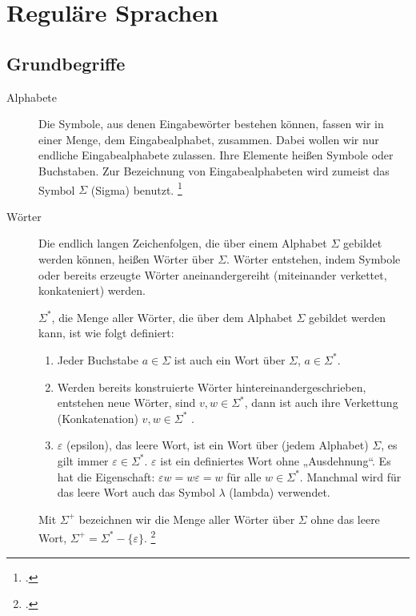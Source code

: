\documentclass{bschlangaul-theorie}
\begin{document}

\chapter{Reguläre Sprachen}

%

\section{Grundbegriffe}

\begin{description}
\item[Alphabete]

Die Symbole, aus denen Eingabewörter bestehen können, fassen wir in
einer Menge, dem Eingabealphabet, zusammen. Dabei wollen wir nur
endliche Eingabealphabete zulassen. Ihre Elemente heißen Symbole oder
Buchstaben. Zur Bezeichnung von Eingabealphabeten wird zumeist das
Symbol $\Sigma$ (Sigma) benutzt.
\footcite[Seite 15]{vossen}

\item[Wörter]
Die endlich langen Zeichenfolgen, die über einem Alphabet $\Sigma$
gebildet werden können, heißen Wörter über $\Sigma$. Wörter entstehen,
indem Symbole oder bereits erzeugte Wörter aneinandergereiht
(miteinander verkettet, konkateniert) werden.

$\Sigma^*$, die Menge aller Wörter, die über dem Alphabet $\Sigma$
gebildet werden kann, ist wie folgt definiert:

\begin{enumerate}
\item Jeder Buchstabe $a \in \Sigma$ ist auch ein Wort über $\Sigma$,
\dh $a \in \Sigma^*$.

\item Werden bereits konstruierte Wörter hintereinandergeschrieben,
entstehen neue Wörter, \dh sind $v, w \in \Sigma^*$, dann ist auch ihre
Verkettung (Konkatenation) $v, w \in \Sigma^*$ .

\item $\varepsilon$ (epsilon), das leere Wort, ist ein Wort über (jedem
Alphabet) $\Sigma$, \dh es gilt immer $\varepsilon \in \Sigma^*$.
$\varepsilon$ ist ein definiertes Wort ohne „Ausdehnung“. Es hat die
Eigenschaft: $\varepsilon w = w \varepsilon = w$ für alle $w \in
\Sigma^*$. Manchmal wird für das leere Wort auch das Symbol $\lambda$
(lambda) verwendet.
\end{enumerate}

Mit $\Sigma^+$ bezeichnen wir die Menge aller Wörter über $\Sigma$ ohne
das leere Wort, \dh $\Sigma^+ = \Sigma^* - \{ \varepsilon \}$.
\footcite[Seite 16]{vossen}
\end{description}
\end{document}
